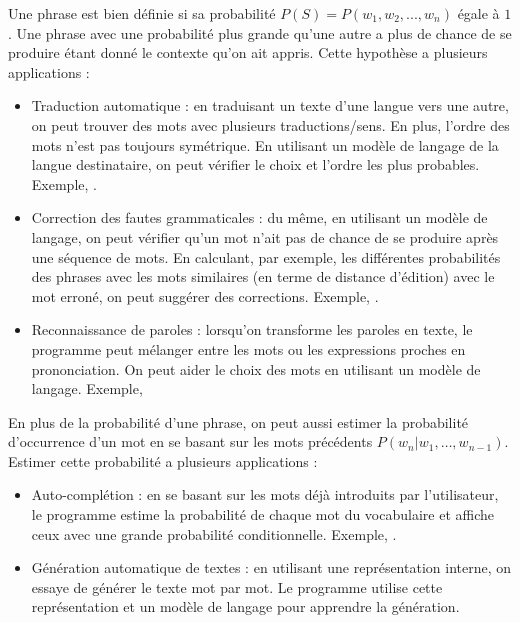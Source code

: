 \documentclass{KodeBook}
\begin{document}
Une phrase est bien définie si sa probabilité $P(S) = P(w_1, w_2, ..., w_n) $ égale à $1$. 
Une phrase avec une probabilité plus grande qu'une autre a plus de chance de se produire étant donné le contexte qu'on ait appris. 
Cette hypothèse a plusieurs applications : 
\begin{itemize}
	\item Traduction automatique : en traduisant un texte d'une langue vers une autre, on peut trouver des mots avec plusieurs traductions/sens. 
	En plus, l'ordre des mots n'est pas toujours symétrique. 
	En utilisant un modèle de langage de la langue destinataire, on peut vérifier le choix et l'ordre les plus probables. 
	Exemple, 
	.
	
	\item Correction des fautes grammaticales : du même, en utilisant un modèle de langage, on peut vérifier qu'un mot n'ait pas de chance de se produire après une séquence de mots. 
	En calculant, par exemple, les différentes probabilités des phrases avec les mots similaires (en terme de distance d'édition) avec le mot erroné, on peut suggérer des corrections.
	Exemple, .
	
	\item Reconnaissance de paroles : lorsqu'on transforme les paroles en texte, le programme peut mélanger entre les mots ou les expressions proches en prononciation. 
	On peut aider le choix des mots en utilisant un modèle de langage.
	Exemple, 
\end{itemize}
%
En plus de la probabilité d'une phrase, on peut aussi estimer la probabilité d'occurrence d'un mot en se basant sur les mots précédents $P(w_n | w_1, \ldots, w_{n-1}) $. 
Estimer cette probabilité a plusieurs applications :
\begin{itemize}
	\item Auto-complétion : en se basant sur les mots déjà introduits par l'utilisateur, le programme estime la probabilité de chaque mot du vocabulaire et affiche ceux avec une grande probabilité conditionnelle.
	Exemple, .
	
	\item Génération automatique de textes : en utilisant une représentation interne, on essaye de générer le texte mot par mot. 
	Le programme utilise cette représentation et un modèle de langage pour apprendre la génération.
\end{itemize}
\end{document}

